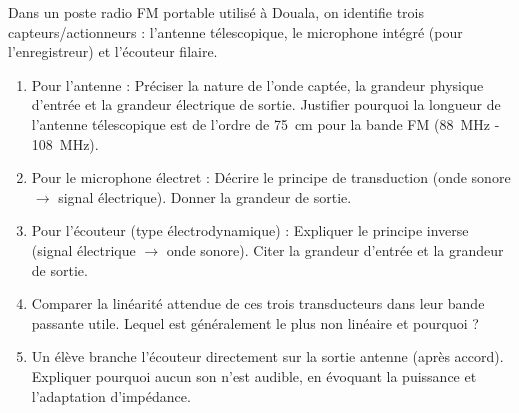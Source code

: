 \documentclass[11pt]{article}
\begin{document}
\begin{exercice}
Dans un poste radio FM portable utilisé à Douala, on identifie trois capteurs/actionneurs : l'antenne télescopique, le microphone intégré (pour l'enregistreur) et l'écouteur filaire.
\begin{enumerate}
    \item Pour l'antenne : Préciser la nature de l'onde captée, la grandeur physique d'entrée et la grandeur électrique de sortie. Justifier pourquoi la longueur de l'antenne télescopique est de l'ordre de \SI{75}{cm} pour la bande FM (\SI{88}{MHz} - \SI{108}{MHz}).
    \item Pour le microphone électret : Décrire le principe de transduction (onde sonore $\rightarrow$ signal électrique). Donner la grandeur de sortie.
    \item Pour l'écouteur (type électrodynamique) : Expliquer le principe inverse (signal électrique $\rightarrow$ onde sonore). Citer la grandeur d'entrée et la grandeur de sortie.
    \item Comparer la linéarité attendue de ces trois transducteurs dans leur bande passante utile. Lequel est généralement le plus non linéaire et pourquoi ?
    \item Un élève branche l'écouteur directement sur la sortie antenne (après accord). Expliquer pourquoi aucun son n'est audible, en évoquant la puissance et l'adaptation d'impédance.
\end{enumerate}
\end{exercice}
\end{document}
